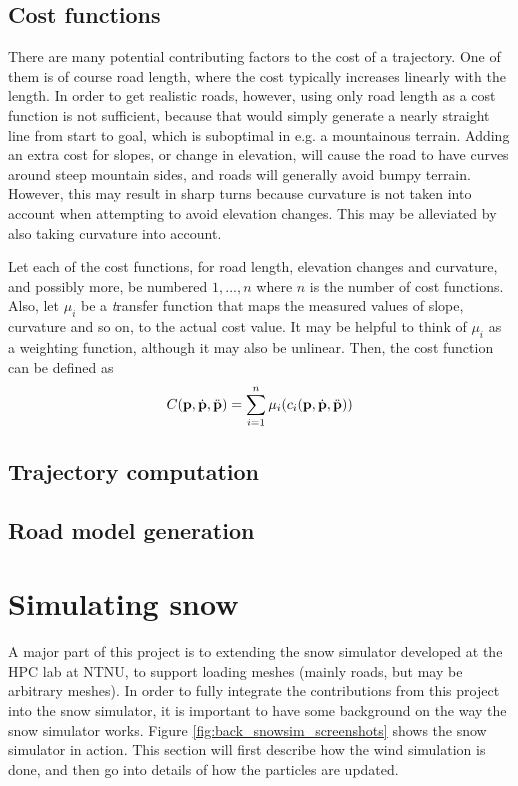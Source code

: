 \subsection{Cost functions}
There are many potential contributing factors to the cost of a trajectory. One of them is of course road length, where the cost typically increases linearly with the length. In order to get realistic roads, however, using only road length as a cost function is not sufficient, because that would simply generate a nearly straight line from start to goal, which is suboptimal in e.g. a mountainous terrain. Adding an extra cost for slopes, or change in elevation, will cause the road to have curves around steep mountain sides, and roads will generally avoid bumpy terrain. However, this may result in sharp turns because curvature is not taken into account when attempting to avoid elevation changes. This may be alleviated by also taking curvature into account.

Let each of the cost functions, for road length, elevation changes and curvature, and possibly more, be numbered $1, ..., n$ where $n$ is the number of cost functions. Also, let $\mu_i$ be a {\textit transfer function} that maps the measured values of slope, curvature and so on, to the actual cost value. It may be helpful to think of $\mu_i$ as a weighting function, although it may also be unlinear. Then, the cost function can be defined as
$$
C({\mathbf p}, \dot{{\mathbf p}}, \ddot{\mathbf{p}}) = \sum_{i=1}^{n} \mu_i(c_i({\mathbf p}, \dot{{\mathbf p}}, \ddot{\mathbf{p}}))
$$

\subsection{Trajectory computation}

\subsection{Road model generation}



\section{Simulating snow}
A major part of this project is to extending the snow simulator developed at the HPC lab at NTNU, to support loading meshes (mainly roads, but may be arbitrary meshes). In order to fully integrate the contributions from this project into the snow simulator, it is important to have some background on the way the snow simulator works. Figure \ref{fig:back_snowsim_screenshots} shows the snow simulator in action. This section will first describe how the wind simulation is done, and then go into details of how the particles are updated. 

